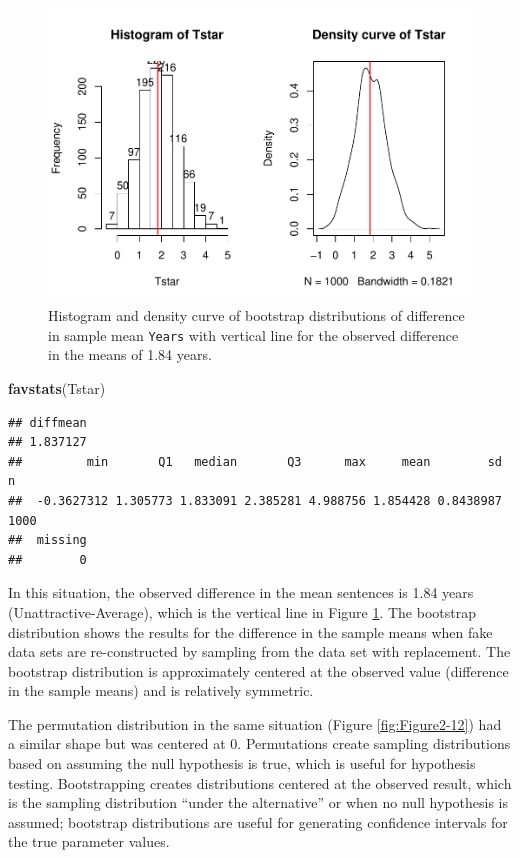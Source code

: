 \documentclass[]{book}
\newenvironment{Shaded}{\begin{snugshade}}{\end{snugshade}}
\newcommand{\KeywordTok}[1]{\textcolor[rgb]{0.13,0.29,0.53}{\textbf{{#1}}}}
\newcommand{\NormalTok}[1]{{#1}}
\begin{document}
\begin{figure}[htbp]
\centering
\includegraphics{GreenwoodBanner_files/figure-latex/Figure2-18-1.pdf}
\caption{\label{fig:Figure2-18}Histogram and density curve of bootstrap distributions of
difference in sample mean \texttt{Years} with vertical line for the
observed difference in the means of 1.84 years.}
\end{figure}

\begin{Shaded}
\begin{Highlighting}[]
\KeywordTok{favstats}\NormalTok{(Tstar)}
\end{Highlighting}
\end{Shaded}

\begin{verbatim}
## diffmean 
## 1.837127 
##         min       Q1   median       Q3      max     mean        sd    n
##  -0.3627312 1.305773 1.833091 2.385281 4.988756 1.854428 0.8438987 1000
##  missing
##        0
\end{verbatim}

In this situation, the observed difference in the mean sentences is 1.84
years (Unattractive-Average), which is the vertical line in Figure
\ref{fig:Figure2-18}. The bootstrap distribution shows the results for
the difference in the sample means when fake data sets are
re-constructed by sampling from the data set with replacement. The
bootstrap distribution is approximately centered at the observed value
(difference in the sample means) and is relatively symmetric.

The permutation distribution in the same situation (Figure
\ref{fig:Figure2-12}) had a similar shape but was centered at 0.
Permutations create sampling distributions based on assuming the null
hypothesis is true, which is useful for hypothesis testing.
Bootstrapping creates distributions centered at the observed result,
which is the sampling distribution ``under the alternative'' or when no
null hypothesis is assumed; bootstrap distributions are useful for
generating confidence intervals for the true parameter values.
\end{document}
